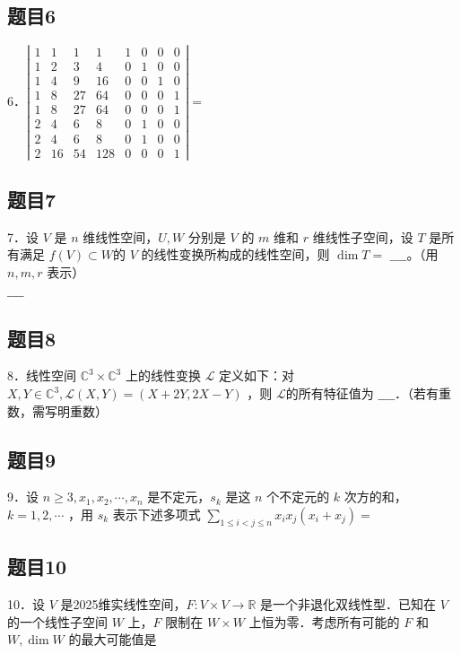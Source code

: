 \documentclass{article}
\begin{document}
\subsection{题目6}
6．\(\left|\begin{array}{cccccccc}1 & 1 & 1 & 1 & 1 & 0 & 0 & 0 \\ 1 & 2 & 3 & 4 & 0 & 1 & 0 & 0 \\ 1 & 4 & 9 & 16 & 0 & 0 & 1 & 0 \\ 1 & 8 & 27 & 64 & 0 & 0 & 0 & 1 \\ 1 & 8 & 27 & 64 & 0 & 0 & 0 & 1 \\ 2 & 4 & 6 & 8 & 0 & 1 & 0 & 0 \\ 2 & 4 & 6 & 8 & 0 & 1 & 0 & 0 \\ 2 & 16 & 54 & 128 & 0 & 0 & 0 & 1\end{array}\right|=\)

\subsection{题目7}
7．设 \(V\) 是 \(n\) 维线性空间，\(U, W\) 分别是 \(V\) 的 \(m\) 维和 \(r\) 维线性子空间，设 \(T\) 是所有满足 \(f(V) \subset W\)的 \(V\) 的线性变换所构成的线性空间，则 \(\operatorname{dim} T=\) \(\_\_\_\_\)。（用 \(n, m, r\) 表示）\\
\(\_\_\_\_\)

\subsection{题目8}
8．线性空间 \(\mathbb{C}^{3} \times \mathbb{C}^{3}\) 上的线性变换 \(\mathcal{L}\) 定义如下：对 \(X, Y \in \mathbb{C}^{3}, \mathcal{L}(X, Y)=(X+2 Y, 2 X-Y)\) ，则 \(\mathcal{L}\)的所有特征值为 \(\_\_\_\_\)．（若有重数，需写明重数）

\subsection{题目9}
9．设 \(n \geq 3, x_{1}, x_{2}, \cdots, x_{n}\) 是不定元，\(s_{k}\) 是这 \(n\) 个不定元的 \(k\) 次方的和，\(k=1,2, \cdots\) ，用 \(s_{k}\) 表示下述多项式 \(\sum_{1 \leq i<j \leq n} x_{i} x_{j}\left(x_{i}+x_{j}\right)=\)

\subsection{题目10}
10．设 \(V\) 是2025维实线性空间，\(F: V \times V \rightarrow \mathbb{R}\) 是一个非退化双线性型．已知在 \(V\) 的一个线性子空间 \(W\) 上，\(F\) 限制在 \(W \times W\) 上恒为零．考虑所有可能的 \(F\) 和 \(W, \operatorname{dim} W\) 的最大可能值是
\end{document}
